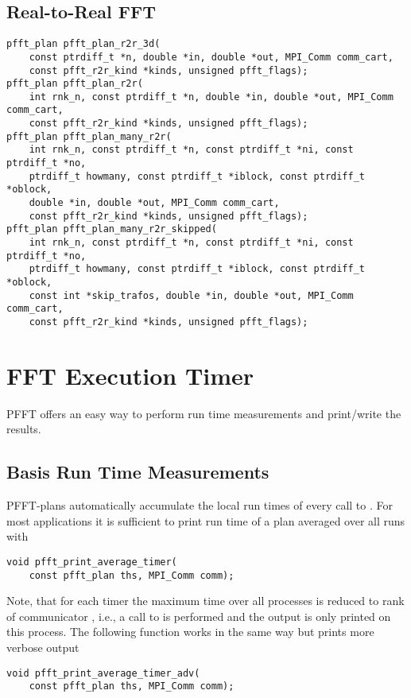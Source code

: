 \subsection{Real-to-Real FFT}
\begin{lstlisting}
pfft_plan pfft_plan_r2r_3d(
    const ptrdiff_t *n, double *in, double *out, MPI_Comm comm_cart,
    const pfft_r2r_kind *kinds, unsigned pfft_flags);
pfft_plan pfft_plan_r2r(
    int rnk_n, const ptrdiff_t *n, double *in, double *out, MPI_Comm comm_cart,
    const pfft_r2r_kind *kinds, unsigned pfft_flags);
pfft_plan pfft_plan_many_r2r(
    int rnk_n, const ptrdiff_t *n, const ptrdiff_t *ni, const ptrdiff_t *no,
    ptrdiff_t howmany, const ptrdiff_t *iblock, const ptrdiff_t *oblock,
    double *in, double *out, MPI_Comm comm_cart,
    const pfft_r2r_kind *kinds, unsigned pfft_flags);
pfft_plan pfft_plan_many_r2r_skipped(
    int rnk_n, const ptrdiff_t *n, const ptrdiff_t *ni, const ptrdiff_t *no,
    ptrdiff_t howmany, const ptrdiff_t *iblock, const ptrdiff_t *oblock,
    const int *skip_trafos, double *in, double *out, MPI_Comm comm_cart,
    const pfft_r2r_kind *kinds, unsigned pfft_flags);
\end{lstlisting}

\section{FFT Execution Timer}
PFFT offers an easy way to perform run time measurements and print/write the results.

\subsection{Basis Run Time Measurements}
PFFT-plans automatically accumulate the local run times of every call to .
For most applications it is sufficient to print run time of a plan  averaged over all runs with
\begin{lstlisting}
void pfft_print_average_timer(
    const pfft_plan ths, MPI_Comm comm);
\end{lstlisting}
Note, that for each timer the maximum time over all processes is reduced to rank  of communicator ,
i.e., a call to  is performed and the output is only printed on this process.
The following function works in the same way but prints more verbose output
\begin{lstlisting}
void pfft_print_average_timer_adv(
    const pfft_plan ths, MPI_Comm comm);
\end{lstlisting}

